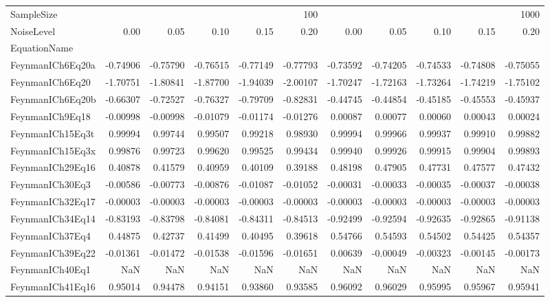 \begin{tabular}{lrrrrrrrrrr}
\toprule
SampleSize & \multicolumn{5}{r}{100} & \multicolumn{5}{r}{1000} \\
NoiseLevel & 0.00 & 0.05 & 0.10 & 0.15 & 0.20 & 0.00 & 0.05 & 0.10 & 0.15 & 0.20 \\
EquationName &  &  &  &  &  &  &  &  &  &  \\
\midrule
FeynmanICh6Eq20a & -0.74906 & -0.75790 & -0.76515 & -0.77149 & -0.77793 & -0.73592 & -0.74205 & -0.74533 & -0.74808 & -0.75055 \\
FeynmanICh6Eq20 & -1.70751 & -1.80841 & -1.87700 & -1.94039 & -2.00107 & -1.70247 & -1.72163 & -1.73264 & -1.74219 & -1.75102 \\
FeynmanICh6Eq20b & -0.66307 & -0.72527 & -0.76327 & -0.79709 & -0.82831 & -0.44745 & -0.44854 & -0.45185 & -0.45553 & -0.45937 \\
FeynmanICh9Eq18 & -0.00998 & -0.00998 & -0.01079 & -0.01174 & -0.01276 & 0.00087 & 0.00077 & 0.00060 & 0.00043 & 0.00024 \\
FeynmanICh15Eq3t & 0.99994 & 0.99744 & 0.99507 & 0.99218 & 0.98930 & 0.99994 & 0.99966 & 0.99937 & 0.99910 & 0.99882 \\
FeynmanICh15Eq3x & 0.99876 & 0.99723 & 0.99620 & 0.99525 & 0.99434 & 0.99940 & 0.99926 & 0.99915 & 0.99904 & 0.99893 \\
FeynmanICh29Eq16 & 0.40878 & 0.41579 & 0.40959 & 0.40109 & 0.39188 & 0.48198 & 0.47905 & 0.47731 & 0.47577 & 0.47432 \\
FeynmanICh30Eq3 & -0.00586 & -0.00773 & -0.00876 & -0.01087 & -0.01052 & -0.00031 & -0.00033 & -0.00035 & -0.00037 & -0.00038 \\
FeynmanICh32Eq17 & -0.00003 & -0.00003 & -0.00003 & -0.00003 & -0.00003 & -0.00003 & -0.00003 & -0.00003 & -0.00003 & -0.00003 \\
FeynmanICh34Eq14 & -0.83193 & -0.83798 & -0.84081 & -0.84311 & -0.84513 & -0.92499 & -0.92594 & -0.92635 & -0.92865 & -0.91138 \\
FeynmanICh37Eq4 & 0.44875 & 0.42737 & 0.41499 & 0.40495 & 0.39618 & 0.54766 & 0.54593 & 0.54502 & 0.54425 & 0.54357 \\
FeynmanICh39Eq22 & -0.01361 & -0.01472 & -0.01538 & -0.01596 & -0.01651 & 0.00639 & -0.00049 & -0.00323 & -0.00145 & -0.00173 \\
FeynmanICh40Eq1 & NaN & NaN & NaN & NaN & NaN & NaN & NaN & NaN & NaN & NaN \\
FeynmanICh41Eq16 & 0.95014 & 0.94478 & 0.94151 & 0.93860 & 0.93585 & 0.96092 & 0.96029 & 0.95995 & 0.95967 & 0.95941 \\

\end{tabular}
